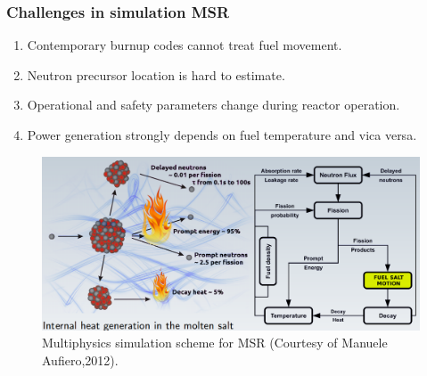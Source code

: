 \begin{frame}
  \frametitle{Challenges in simulation \gls{MSR}}
                  \vspace*{-0.05in}
               \begin{enumerate}
                \item Contemporary burnup codes cannot treat fuel movement.
                \item Neutron precursor location is hard to estimate.
                \item Operational and safety parameters change during reactor operation.
                \item Power generation strongly depends on fuel temperature and vica versa.
               \end{enumerate}

           \begin{figure}[t]
                \vspace*{-0.3in}
			\hspace*{-0.2in}
                \includegraphics[height=0.5\textwidth]{./images/coupled_physics.png}
		\vspace*{-0.05in}
		\caption{Multiphysics simulation scheme for \gls{MSR} (Courtesy of Manuele Aufiero,2012).}
     	 \end{figure}               
\end{frame}

